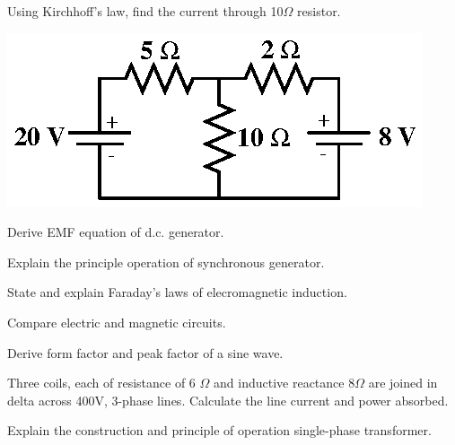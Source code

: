 \partBt

\item Using Kirchhoff's law, find the current through 10$\Omega$ resistor.

  \begin{center}

    \includegraphics[scale=1]{src/s1s2/en/09_107/fig1}\\
    


  \end{center}





\item Derive EMF equation of d.c. generator.

\item Explain the principle operation of synchronous generator.

\partC

\item \iitem \iitem State and explain Faraday's laws of elecromagnetic induction. 

\item Compare electric and magnetic circuits. 

\ene

\Or

\newpage

\again

\item \iitem Derive form factor and peak factor of a sine wave.  

\item Three coils, each of resistance of 6 $\Omega$ and inductive reactance 8$\Omega$ are joined in delta across
  400V, 3-phase lines. Calculate the line current and power absorbed. 

\ene\ene

\item \iitem Explain the construction and principle of operation  single-phase transformer.

